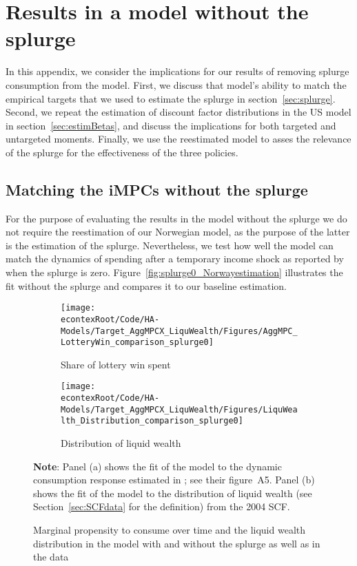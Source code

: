 \documentclass[\econtexRoot/HAFiscal]{subfiles}
\begin{document}
\hypertarget{Model_without_splurge}{}\par\section{Results in a model without the splurge}
\notinsubfile{\label{app:Model_without_splurge}}

In this appendix, we consider the implications for our results of removing splurge consumption from the model.
First, we discuss that model's ability to match the empirical targets that we used to estimate the splurge in section~\ref{sec:splurge}.
Second, we repeat the estimation of discount factor distributions in the US model in section~\ref{sec:estimBetas}, and discuss the implications for both targeted and untargeted moments.
Finally, we use the reestimated model to asses the relevance of the splurge for the effectiveness of the three policies.


\subsection{Matching the iMPCs without the splurge}

For the purpose of evaluating the results in the model without the splurge we do not require the reestimation of our Norwegian model, as the purpose of the latter is the estimation of the splurge.
Nevertheless, we test how well the model can match the dynamics of spending after a temporary income shock as reported by \citet{fagereng_mpc_2021} when the splurge is zero.
Figure~\ref{fig:splurge0_Norwayestimation} illustrates the fit without the splurge and compares it to our baseline estimation.


\begin{figure}[htb]
	\centering
	\begin{subfigure}[b]{.48\linewidth}
		\centering
		\texttt{[image: \\econtexRoot/Code/HA-Models/Target\_AggMPCX\_LiquWealth/Figures/AggMPC\_LotteryWin\_comparison\_splurge0]}
		\caption{Share of lottery win spent}

	\end{subfigure}
	\begin{subfigure}[b]{.48\linewidth}
		\centering
		\texttt{[image: \\econtexRoot/Code/HA-Models/Target\_AggMPCX\_LiquWealth/Figures/LiquWealth\_Distribution\_comparison\_splurge0]}
		\caption{Distribution of liquid wealth}
	\end{subfigure}%
	\caption{Marginal propensity to consume over time and the liquid wealth distribution in the model with and without the splurge as well as in the data}
	\notinsubfile{\label{fig:splurge0_Norwayestimation}}
	\parbox{16cm}{\small \vspace{.15cm} \textbf{Note}: Panel (a) shows the fit of the model to the dynamic consumption response estimated in \citet{fagereng_mpc_2021}; see their figure~A5.
Panel (b) shows the fit of the model to the distribution of liquid wealth (see Section~\ref{sec:SCFdata} for the definition) from the 2004 SCF.\normalsize}
\end{figure}
\end{document}
